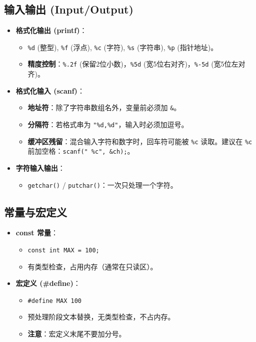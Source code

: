\documentclass[a4paper,12pt]{article}
\begin{document}
\subsection{输入输出 (Input/Output)}
\begin{itemize}
    \item \textbf{格式化输出 (printf)}：
    \begin{itemize}
        \item \texttt{\%d} (整型), \texttt{\%f} (浮点), \texttt{\%c} (字符), \texttt{\%s} (字符串), \texttt{\%p} (指针地址)。
        \item \textbf{精度控制}：\texttt{\%.2f} (保留2位小数)，\texttt{\%5d} (宽5位右对齐)，\texttt{\%-5d} (宽5位左对齐)。
    \end{itemize}
    \item \textbf{格式化输入 (scanf)}：
    \begin{itemize}
        \item \textbf{地址符}：除了字符串数组名外，变量前必须加 \texttt{\&}。
        \item \textbf{分隔符}：若格式串为 \texttt{"\%d,\%d"}，输入时必须加逗号。
        \item \textbf{缓冲区残留}：混合输入字符和数字时，回车符可能被 \texttt{\%c} 读取。建议在 \texttt{\%c} 前加空格：\texttt{scanf(" \%c", \&ch);}。
    \end{itemize}
    \item \textbf{字符输入输出}：
    \begin{itemize}
        \item \texttt{getchar()} / \texttt{putchar()}：一次只处理一个字符。
    \end{itemize}
\end{itemize}

\subsection{常量与宏定义}
\begin{itemize}
    \item \textbf{const 常量}：
    \begin{itemize}
        \item \texttt{const int MAX = 100;}
        \item 有类型检查，占用内存（通常在只读区）。
    \end{itemize}
    \item \textbf{宏定义 (\#define)}：
    \begin{itemize}
        \item \texttt{\#define MAX 100}
        \item 预处理阶段文本替换，无类型检查，不占内存。
        \item \textbf{注意}：宏定义末尾不要加分号。
    \end{itemize}
\end{itemize}
\end{document}
